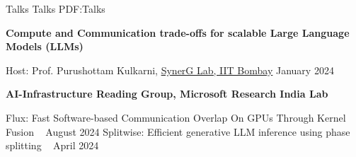 \Section
{Talks}
{Talks}
{PDF:Talks}

\Entry
\textbf{Compute and Communication trade-offs for scalable Large Language Models (LLMs)}
\href{https://docs.google.com/presentation/d/1yJpd59T_oaCOk1FHXqCBuS0r-6khT4hs/edit?usp=sharing\&ouid=115404491843216655340\&rtpof=true\&sd=true}{\faFilePowerpoint}
\begin{Detail}
\Item Host: Prof. Purushottam Kulkarni, \href{https://www.cse.iitb.ac.in/synerg/series}{SynerG Lab, IIT Bombay} 
	    \hfill January 2024
\end{Detail}

\Gap
\Entry
\textbf{AI-Infrastructure Reading Group, Microsoft Research India Lab}
\begin{Detail}
    \Item Flux: Fast Software-based Communication Overlap On GPUs Through Kernel Fusion ~\href{https://docs.google.com/presentation/d/1wL7XNxi0yYkCU0eeXE7_9vjh7JoUO9Md/edit?usp=share_link\&ouid=115404491843216655340\&rtpof=true\&sd=true}{\faFilePowerpoint}
	    \hfill August 2024
        \Item Splitwise: Efficient generative LLM inference using phase splitting ~\href{https://docs.google.com/presentation/d/1pzbd9vdi62koGaf3ohjbLxD18wksRyG5/edit?usp=sharing\&ouid=115404491843216655340\&rtpof=true\&sd=true}{\faFilePowerpoint}
        \hfill April 2024
\end{Detail}